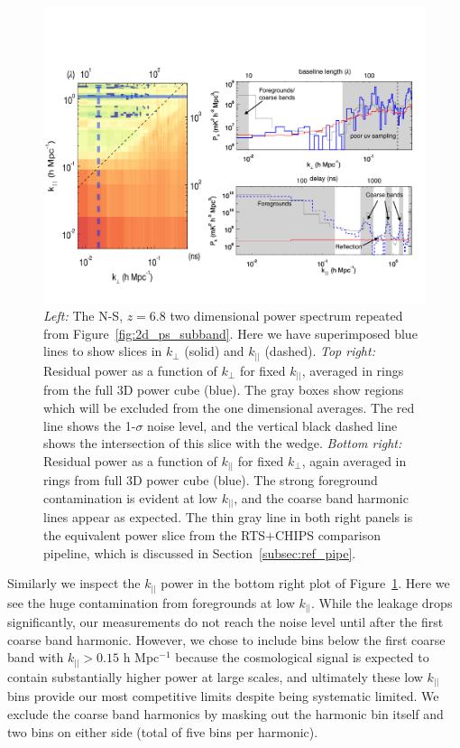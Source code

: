 \documentclass[iop]{emulateapj}
\begin{document}
\begin{figure}
\begin{center}
\includegraphics[width=\textwidth]{slices.pdf}
\caption{
\emph{Left:} The N-S, $z=6.8$ two dimensional power spectrum repeated from 
Figure~\ref{fig:2d_ps_subband}. Here we have superimposed blue lines to show slices in
$k_{\perp}$ (solid) and $k_{||}$ (dashed). \emph{Top right:} Residual power as a function
of $k_{\perp}$ for fixed $k_{||}$, averaged in rings from the full 3D power cube (blue). The gray boxes show regions which will be excluded from
the one dimensional averages. The red line shows the 1-$\sigma$ noise level, and
the vertical black dashed line shows the intersection of this slice with the wedge. 
\emph{Bottom right:} Residual power as a function of $k_{||}$ for fixed $k_{\perp}$, again averaged in rings from full 3D power cube (blue). The strong
foreground contamination is evident at low $k_{||}$, and the coarse band harmonic lines
appear as expected. The thin gray line in both right panels is the equivalent power slice from the RTS$+$CHIPS comparison pipeline, which is discussed in Section~\ref{subsec:ref_pipe}.
\label{fig:slices}
}
\end{center}
\end{figure}

Similarly we inspect the $k_{||}$ power in the bottom right plot of Figure~\ref{fig:slices}. Here
we see the huge contamination from foregrounds at low $k_{||}$. While the leakage drops 
significantly, our measurements do not reach the noise level until after the first coarse
band harmonic. However, we chose to include bins below the first coarse band with 
$k_{||}>0.15$ h Mpc$^{-1}$ because the cosmological signal is expected to contain 
substantially higher power at large scales, and ultimately these low $k_{||}$ bins provide
our most competitive limits despite being systematic limited. We exclude the coarse band
harmonics by masking out the harmonic bin itself and two bins on either side (total of five
bins per harmonic).
\end{document}
